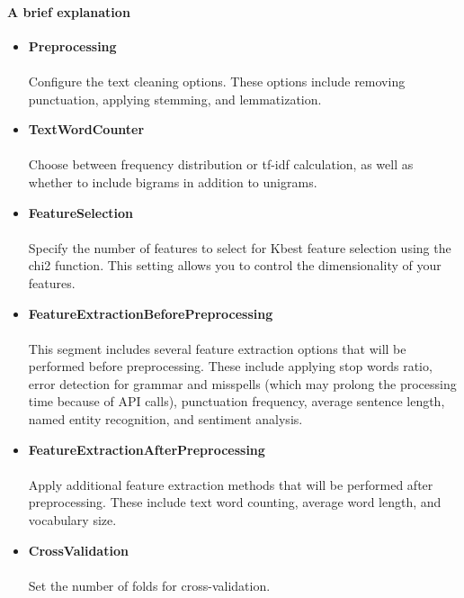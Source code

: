 \paragraph{\fontsize{14}{17}\selectfont A brief explanation}
\label{subsubsec:config-brief-explain}
\begin{itemize}
    \item \textbf{Preprocessing}\\\\
    Configure the text cleaning options. These options include removing punctuation, applying stemming, and lemmatization.\\
    
    \item \textbf{TextWordCounter}\\\\
    Choose between frequency distribution or tf-idf calculation, as well as whether to include bigrams in addition to unigrams.\\
    
    \item \textbf{FeatureSelection}\\\\
    Specify the number of features to select for Kbest feature selection using the chi2 function. This setting allows you to control the dimensionality of your features.\\
    
    \item \textbf{FeatureExtractionBeforePreprocessing}\\\\
    This segment includes several feature extraction options that will be performed before preprocessing. These include applying stop words ratio, error detection for grammar and misspells (which may prolong the processing time because of API calls), punctuation frequency, average sentence length, named entity recognition, and sentiment analysis.\\
    
    \item \textbf{FeatureExtractionAfterPreprocessing}\\\\
    Apply additional feature extraction methods that will be performed after preprocessing. These include text word counting, average word length, and vocabulary size.\\
    
    \item \textbf{CrossValidation}\\\\
    Set the number of folds for cross-validation.\\
\end{itemize}

